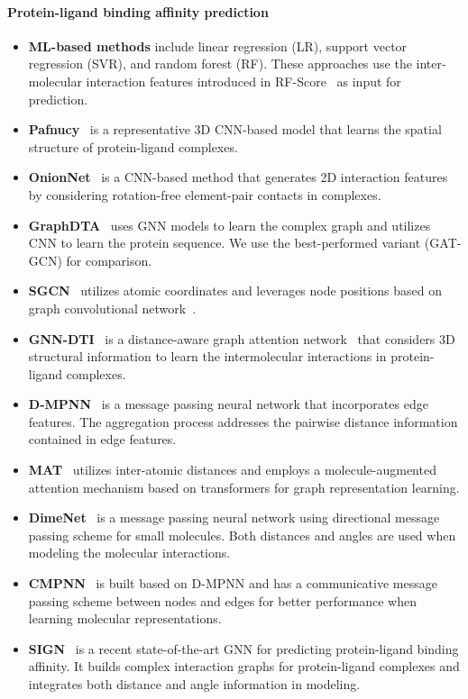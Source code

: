 \documentclass[fleqn,10pt]{wlscirep}
\begin{document}
\paragraph{Protein-ligand binding affinity prediction}
\begin{itemize}[leftmargin=10pt]
\item \textbf{ML-based methods} include linear regression (LR), support vector regression (SVR), and random forest (RF). These approaches use the inter-molecular interaction features introduced in RF-Score~\cite{ballester2010machine} as input for prediction.
\item \textbf{Pafnucy}~\cite{stepniewska2018development} is a representative 3D CNN-based model that learns the spatial structure of protein-ligand complexes.
\item \textbf{OnionNet}~\cite{zheng2019onionnet} is a CNN-based method that generates 2D interaction features by considering rotation-free element-pair contacts in complexes.
\item \textbf{GraphDTA}~\cite{nguyen2021graphdta} uses GNN models to learn the complex graph and utilizes CNN to learn the protein sequence. We use the best-performed variant (GAT-GCN) for comparison.
\item \textbf{SGCN}~\cite{danel2020spatial} utilizes atomic coordinates and leverages node positions based on graph convolutional network~\cite{kipf2016semi}.
\item \textbf{GNN-DTI}~\cite{lim2019predicting} is a distance-aware graph attention network~\cite{velivckovic2018graph} that considers 3D structural information to learn the intermolecular interactions in protein-ligand complexes.
\item \textbf{D-MPNN}~\cite{yang2019analyzing} is a message passing neural network that incorporates edge features. The aggregation process addresses the pairwise distance information contained in edge features.
\item \textbf{MAT}~\cite{maziarka2020molecule} utilizes inter-atomic distances and employs a molecule-augmented attention mechanism based on transformers for graph representation learning.
\item \textbf{DimeNet}~\cite{klicpera_dimenet_2020} is a message passing neural network using directional message passing scheme for small molecules. Both distances and angles are used when modeling the molecular interactions.
\item \textbf{CMPNN}~\cite{song2020communicative} is built based on D-MPNN and has a communicative message passing scheme between nodes and edges for better performance when learning molecular representations.
\item \textbf{SIGN}~\cite{li2021structure} is a recent state-of-the-art GNN for predicting protein-ligand binding affinity. It builds complex interaction graphs for protein-ligand complexes and integrates both distance and angle information in modeling.
\end{itemize}
\end{document}
